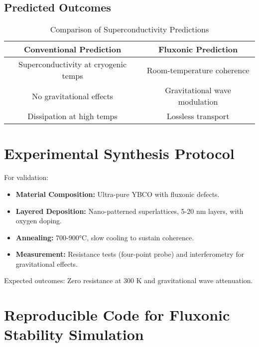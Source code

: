 \documentclass{article}
\begin{document}
\subsection{Predicted Outcomes}
\begin{table}[h]
    \centering
    \begin{tabular}{|c|c|}
        \hline
        \textbf{Conventional Prediction} & \textbf{Fluxonic Prediction} \\
        \hline
        Superconductivity at cryogenic temps & Room-temperature coherence \\
        No gravitational effects & Gravitational wave modulation \\
        Dissipation at high temps & Lossless transport \\
        \hline
    \end{tabular}
    \caption{Comparison of Superconductivity Predictions}
    \label{tab:predictions}
\end{table}

\section{Experimental Synthesis Protocol}
For validation:
\begin{itemize}
    \item \textbf{Material Composition:} Ultra-pure YBCO with fluxonic defects.
    \item \textbf{Layered Deposition:} Nano-patterned superlattices, 5-20 nm layers, with oxygen doping.
    \item \textbf{Annealing:} 700-900°C, slow cooling to sustain coherence.
    \item \textbf{Measurement:} Resistance tests (four-point probe) and interferometry for gravitational effects.
\end{itemize}
Expected outcomes: Zero resistance at 300 K and gravitational wave attenuation.

\section{Reproducible Code for Fluxonic Stability Simulation}
\end{document}
